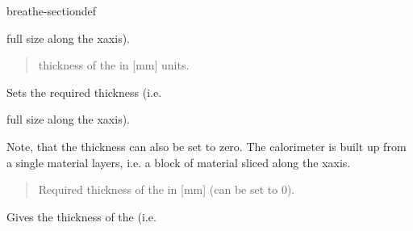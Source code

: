 \documentclass[letterpaper,10pt,english]{sphinxmanual}
\begin{document}
\begin{fulllineitems}
\begin{sphinxuseclass}{breathe-sectiondef}
\begin{fulllineitems}
\sphinxAtStartPar
full size along the x\sphinxhyphen{}axis). \begin{quote}\begin{description}
\sphinxAtStartPar
thickness of the  in {[}mm{]} units. 

\end{description}\end{quote}


\end{fulllineitems}


\begin{fulllineitems}
\label{\detokenize{Simulation/SimulationCodeDoc:_CPPv4N8Geometry11SetGapThickEd}}
\pysigstartsignatures
\pysigstartmultiline
{}
\pysigstopmultiline
\pysigstopsignatures
\sphinxAtStartPar
Sets the required  thickness (i.e. 

\sphinxAtStartPar
full size along the x\sphinxhyphen{}axis).

\sphinxAtStartPar
Note, that the  thickness can also be set to zero. The calorimeter is built up from a single material layers, i.e. a block of material sliced along the x\sphinxhyphen{}axis.

\sphinxAtStartPar
\begin{quote}\begin{description}
\sphinxAtStartPar
\sphinxstylestrong{{[}in{]}} Required thickness of the  in {[}mm{]} (can be set to 0). 

\end{description}\end{quote}


\end{fulllineitems}


\begin{fulllineitems}
\label{\detokenize{Simulation/SimulationCodeDoc:_CPPv4NK8Geometry11GetGapThickEv}}
\pysigstartsignatures
\pysigstartmultiline
{}
\pysigstopmultiline
\pysigstopsignatures
\sphinxAtStartPar
Gives the thickness of the  (i.e. 


\end{fulllineitems}
\end{sphinxuseclass}
\end{fulllineitems}
\end{document}
